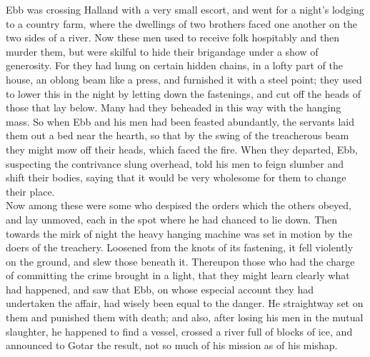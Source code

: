 \documentclass[10pt,a4paper]{report}
\begin{document}
Ebb was crossing Halland with a very small escort, and went for a night's lodging to a country farm, where the dwellings of two brothers faced one another on the two sides of a river. Now these men used to receive folk hospitably and then murder them, but were skilful to hide their brigandage under a show of generosity. For they had hung on certain hidden chains, in a lofty part of the house, an oblong beam like a press, and furnished it with a steel point; they used to lower this in the night by letting down the fastenings, and cut off the heads of those that lay below. Many had they beheaded in this way with the hanging mass. So when Ebb and his men had been feasted abundantly, the servants laid them out a bed near the hearth, so that by the swing of the treacherous beam they might mow off their heads, which faced the fire. When they departed, Ebb, suspecting the contrivance slung overhead, told his men to feign slumber and shift their bodies, saying that it would be very wholesome for them to change their place.\\

Now among these were some who despised the orders which the others obeyed, and lay unmoved, each in the spot where he had chanced to lie down. Then towards the mirk of night the heavy hanging machine was set in motion by the doers of the treachery. Loosened from the knots of its fastening, it fell violently on the ground, and slew those beneath it. Thereupon those who had the charge of committing the crime brought in a light, that they might learn clearly what had happened, and saw that Ebb, on whose especial account they had undertaken the affair, had wisely been equal to the danger. He straightway set on them and punished them with death; and also, after losing his men in the mutual slaughter, he happened to find a vessel, crossed a river full of blocks of ice, and announced to Gotar the result, not so much of his mission as of his mishap.\\
\end{document}
